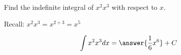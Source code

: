 \documentclass{ximera}
\author{Gregory Hartman \and Matthew Carr\and Nela Lakos}
\begin{document}
\begin{exercise}


Find the indefinite integral of $x^{2}x^{3}$ with respect to $x$.
\begin{hint}
Recall: $x^{2}x^{3}=x^{2+3}=x^5$
\end{hint}
\[
\int x^{2}x^{3} dx=\answer{\frac{1}{6}x^{6}}+C
\]


\end{exercise}
\end{document}
